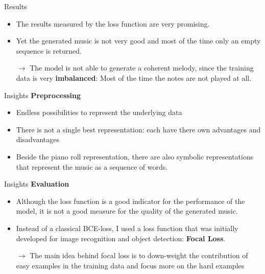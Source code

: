 \documentclass[xcolor={dvipsnames},12pt]{beamer}
\begin{document}
\begin{frame}{Results}
    \begin{itemize}
        \item The results measured by the loss function are very promising.
        \item Yet the generated music is not very good and most of the time
              only an empty sequence is returned.
        \item[$\rightarrow$] The model is not able to generate a coherent
            melody, since the training data is very \textbf{imbalanced}: Most
            of the time the notes are not played at all.
    \end{itemize}
\end{frame}

\begin{frame}{Insights}
    \textbf{Preprocessing}
    \begin{itemize}
        \item Endless possibilities to represent the underlying data
        \item There is not a single best representation: each have there own
              advantages and disadvantages
        \item Beside the piano roll representation, there are also symbolic
              representations that represent the music as a sequence of words.
    \end{itemize}
\end{frame}

\begin{frame}{Insights}
    \textbf{Evaluation}
    \begin{itemize}
        \item Although the loss function is a good indicator for the
              performance of the model, it is not a good measure for the
              quality of the generated music.
        \item Instead of a classical BCE-loss, I used a loss function that was
              initially developed for image recognition and object detection:
              \textbf{Focal Loss}.
        \item[$\rightarrow$] The main idea behind focal loss is to down-weight
            the contribution of easy examples in the training data and focus more
            on the hard examples
    \end{itemize}
\end{frame}
\end{document}
